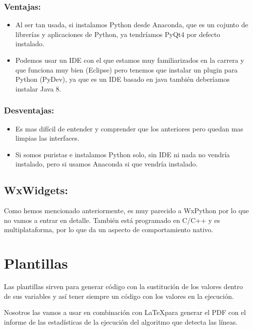 \subsubsection{Ventajas:}

\begin{itemize}
\item Al ser tan usada, si instalamos Python desde Anaconda, que es un cojunto de librerías y aplicaciones de Python, ya tendríamos PyQt4 por defecto instalado.

\item Podemos usar un IDE con el que estamos muy familiarizados en la carrera y que funciona muy bien (Eclipse) pero tenemos que instalar un plugin para Python (PyDev), ya que es un IDE basado en java también deberíamos instalar Java 8.
\end{itemize}

\subsubsection{Desventajas:}

\begin{itemize}
\item Es mas difícil de entender y comprender que los anteriores pero quedan mas limpias las interfaces.
\item Si somos puristas e instalamos Python solo, sin IDE ni nada no vendría instalado, pero si usamos Anaconda si que vendría instalado.
\end{itemize}

\subsection{WxWidgets:}
Como hemos mencionado anteriormente, es muy parecido a WxPython por lo que no vamos a entrar en detalle. También está programado en C/C++ y es multiplataforma, por lo que da un aspecto de comportamiento nativo.



\section{Plantillas}
Las plantillas sirven para generar código con la sustitución de los valores dentro de sus variables y así tener siempre un código con los valores en la ejecución.

Nosotros las vamos a usar en combinación con \LaTeX para generar el PDF con el informe de las estadísticas de la ejecución del algoritmo que detecta las líneas.


